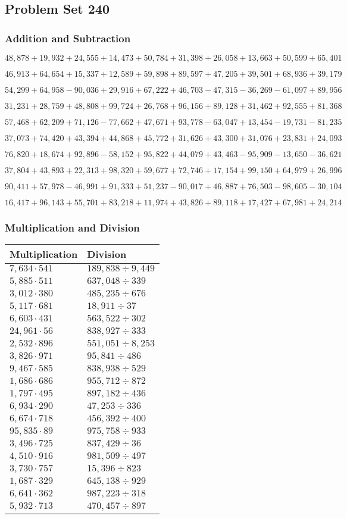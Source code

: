 \hypertarget{problem-set-240}{%
\subsection{Problem Set 240}\label{problem-set-240}}

\hypertarget{addition-and-subtraction}{%
\subsubsection{Addition and
Subtraction}\label{addition-and-subtraction}}

\(48,878+19,932+24,555+14,473+50,784+31,398+26,058+13,663+50,599+65,401\)

\(46,913+64,654+15,337+12,589+59,898+89,597+47,205+39,501+68,936+39,179\)

\(54,299+64,958-90,036+29,916+67,222+46,703-47,315-36,269-61,097+89,956\)

\(31,231+28,759+48,808+99,724+26,768+96,156+89,128+31,462+92,555+81,368\)

\(57,468+62,209+71,126-77,662+47,671+93,778-63,047+13,454-19,731-81,235\)

\(37,073+74,420+43,394+44,868+45,772+31,626+43,300+31,076+23,831+24,093\)

\(76,820+18,674+92,896-58,152+95,822+44,079+43,463-95,909-13,650-36,621\)

\(37,804+43,893+22,313+98,320+59,677+72,746+17,154+99,150+64,979+26,996\)

\(90,411+57,978-46,991+91,333+51,237-90,017+46,887+76,503-98,605-30,104\)

\(16,417+96,143+55,701+83,218+11,974+43,826+89,118+17,427+67,981+24,214\)

\hypertarget{multiplication-and-division}{%
\subsubsection{Multiplication and
Division}\label{multiplication-and-division}}

\begin{longtable}[]{@{}ll@{}}
\toprule
Multiplication & Division\tabularnewline
\midrule
\endhead
\(7,634\cdot541\) & \(189,838÷9,449\)\tabularnewline
\(5,885\cdot511\) & \(637,048÷339\)\tabularnewline
\(3,012\cdot380\) & \(485,235÷676\)\tabularnewline
\(5,117\cdot681\) & \(18,911÷37\)\tabularnewline
\(6,603\cdot431\) & \(563,522÷302\)\tabularnewline
\(24,961\cdot56\) & \(838,927÷333\)\tabularnewline
\(2,532\cdot896\) & \(551,051÷8,253\)\tabularnewline
\(3,826\cdot971\) & \(95,841÷486\)\tabularnewline
\(9,467\cdot585\) & \(838,938÷529\)\tabularnewline
\(1,686\cdot686\) & \(955,712÷872\)\tabularnewline
\(1,797\cdot495\) & \(897,182÷436\)\tabularnewline
\(6,934\cdot290\) & \(47,253÷336\)\tabularnewline
\(6,674\cdot718\) & \(456,392÷400\)\tabularnewline
\(95,835\cdot89\) & \(975,758÷933\)\tabularnewline
\(3,496\cdot725\) & \(837,429÷36\)\tabularnewline
\(4,510\cdot916\) & \(981,509÷497\)\tabularnewline
\(3,730\cdot757\) & \(15,396÷823\)\tabularnewline
\(1,687\cdot329\) & \(645,138÷929\)\tabularnewline
\(6,641\cdot362\) & \(987,223÷318\)\tabularnewline
\(5,932\cdot713\) & \(470,457÷897\)\tabularnewline
\bottomrule
\end{longtable}
